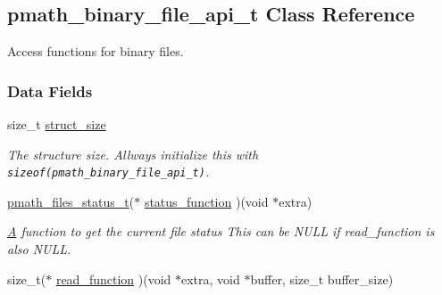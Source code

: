 \hypertarget{structpmath__binary__file__api__t}{
\subsection{pmath\_\-binary\_\-file\_\-api\_\-t Class Reference}
\label{structpmath__binary__file__api__t}
}
Access functions for binary files.  


\subsubsection*{Data Fields}
\begin{CompactItemize}
\item 
\hypertarget{structpmath__binary__file__api__t_f1c8d2a0b5e021ff01f2c1dd132464a8}{
size\_\-t \hyperlink{structpmath__binary__file__api__t_f1c8d2a0b5e021ff01f2c1dd132464a8}{struct\_\-size}}
\label{structpmath__binary__file__api__t_f1c8d2a0b5e021ff01f2c1dd132464a8}

\begin{CompactList}\small\item\em The structure size. Allways initialize this with {\tt sizeof(pmath\_\-binary\_\-file\_\-api\_\-t)}. \item\end{CompactList}\item 
\hypertarget{structpmath__binary__file__api__t_5018fd5d68aaf957e98465105a87b65a}{
\hyperlink{group__file__api_g1fa07caf59a04495b7c74be6aff3a3d9}{pmath\_\-files\_\-status\_\-t}($\ast$ \hyperlink{structpmath__binary__file__api__t_5018fd5d68aaf957e98465105a87b65a}{status\_\-function} )(void $\ast$extra)}
\label{structpmath__binary__file__api__t_5018fd5d68aaf957e98465105a87b65a}

\begin{CompactList}\small\item\em \hyperlink{class_a}{A} function to get the current file status This can be NULL if read\_\-function is also NULL. \item\end{CompactList}\item 
\hypertarget{structpmath__binary__file__api__t_eb5ccc97e169734f337d3ea609129c6e}{
size\_\-t($\ast$ \hyperlink{structpmath__binary__file__api__t_eb5ccc97e169734f337d3ea609129c6e}{read\_\-function} )(void $\ast$extra, void $\ast$buffer, size\_\-t buffer\_\-size)}
\label{structpmath__binary__file__api__t_eb5ccc97e169734f337d3ea609129c6e}


\end{CompactItemize}
